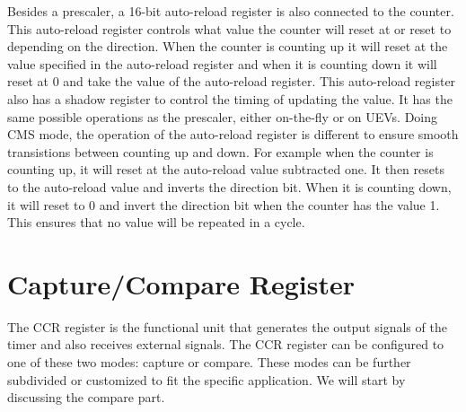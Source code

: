 \documentclass[./dissertation.tex]{subfiles}
\begin{document}
Besides a prescaler, a 16-bit auto-reload register is also connected to the counter. This auto-reload register controls what value the counter will reset at or reset to depending on the direction. When the counter is counting up it will reset at the value specified in the auto-reload register and when it is counting down it will reset at 0 and take the value of the auto-reload register. This auto-reload register also has a shadow register to control the timing of updating the value. It has the same possible operations as the prescaler, either on-the-fly or on UEVs. Doing CMS mode, the operation of the auto-reload register is different to ensure smooth transistions between counting up and down. For example when the counter is counting up, it will reset at the auto-reload value subtracted one. It then resets to the auto-reload value and inverts the direction bit. When it is counting down, it will reset to 0 and invert the direction bit when the counter has the value 1. This ensures that no value will be repeated in a cycle. 

\section{Capture/Compare Register}
The CCR register is the functional unit that generates the output signals of the timer and also receives external signals. The CCR register can be configured to one of these two modes: capture or compare. These modes can be further subdivided or customized to fit the specific application. We will start by discussing the compare part.
\end{document}
